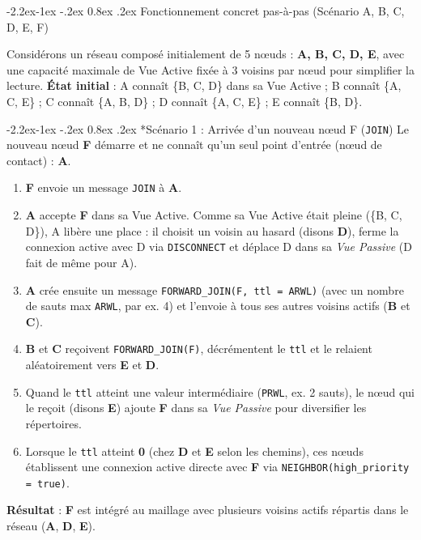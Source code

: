 \documentclass[11pt,a4paper]{article}
\makeatletter
\renewcommand\subsubsection{\@startsection{subsubsection}{3}{\z@}%
                                     {-2.2ex\@plus -1ex \@minus -.2ex}%
                                     {0.8ex \@plus .2ex}%
                                     {\normalfont\normalsize\bfseries\color{AccentTeal}}}
\makeatother
\begin{document}
\subsubsection{Fonctionnement concret pas-à-pas (Scénario A, B, C, D, E, F)}

Considérons un réseau composé initialement de 5 nœuds : \textbf{A, B, C, D, E}, avec une capacité maximale de Vue Active fixée à 3 voisins par nœud pour simplifier la lecture.
\textbf{État initial} : A connaît \{B, C, D\} dans sa Vue Active ; B connaît \{A, C, E\} ; C connaît \{A, B, D\} ; D connaît \{A, C, E\} ; E connaît \{B, D\}.

\subsubsection*{Scénario 1 : Arrivée d'un nouveau nœud F (\texttt{JOIN})}
Le nouveau nœud \textbf{F} démarre et ne connaît qu'un seul point d'entrée (nœud de contact) : \textbf{A}.
\begin{enumerate}
    \item \textbf{F} envoie un message \texttt{JOIN} à \textbf{A}.
    \item \textbf{A} accepte \textbf{F} dans sa Vue Active. Comme sa Vue Active était pleine (\{B, C, D\}), A libère une place : il choisit un voisin au hasard (disons \textbf{D}), ferme la connexion active avec D via \texttt{DISCONNECT} et déplace D dans sa \emph{Vue Passive} (D fait de même pour A).
    \item \textbf{A} crée ensuite un message \texttt{FORWARD\_JOIN(F, ttl = ARWL)} (avec un nombre de sauts max \texttt{ARWL}, par ex. 4) et l'envoie à tous ses autres voisins actifs (\textbf{B} et \textbf{C}).
    \item \textbf{B} et \textbf{C} reçoivent \texttt{FORWARD\_JOIN(F)}, décrémentent le \texttt{ttl} et le relaient aléatoirement vers \textbf{E} et \textbf{D}.
    \item Quand le \texttt{ttl} atteint une valeur intermédiaire (\texttt{PRWL}, ex. 2 sauts), le nœud qui le reçoit (disons \textbf{E}) ajoute \textbf{F} dans sa \emph{Vue Passive} pour diversifier les répertoires.
    \item Lorsque le \texttt{ttl} atteint \textbf{0} (chez \textbf{D} et \textbf{E} selon les chemins), ces nœuds établissent une connexion active directe avec \textbf{F} via \texttt{NEIGHBOR(high\_priority = true)}.
\end{enumerate}
\textbf{Résultat} : \textbf{F} est intégré au maillage avec plusieurs voisins actifs répartis dans le réseau (\textbf{A}, \textbf{D}, \textbf{E}).
\end{document}
